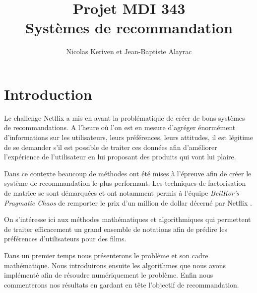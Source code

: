 \documentclass[10pt,a4paper]{article}
\title{Projet MDI 343 \\
Systèmes de recommandation}
\author{Nicolas Keriven et Jean-Baptiste Alayrac}
\begin{document}
\maketitle

\hrulefill
\vspace{2cm}

\newcommand{\jel}{\textsc{Jellyfish} }
\renewcommand{\tablename}{TABLEAU}

%
%


\newpage
\tableofcontents

\section*{Introduction}
 
 Le challenge Netflix a mis en avant la problématique de créer de bons systèmes de recommandations. A l'heure où l'on est en mesure d'agréger énormément d'informations sur les utilisateurs, leurs préférences, leurs attitudes, il est légitime de se demander s'il est possible de traiter ces données afin d'améliorer l'expérience de l'utilisateur en lui proposant des produits qui vont lui plaire.
 
 Dans ce contexte beaucoup de méthodes ont été mises à l'épreuve afin de créer le système de recommandation le plus performant. Les techniques de factorisation de matrice se sont démarquées et ont notamment permis à l'équipe \textit{BellKor's Pragmatic Chaos} de remporter le prix d'un million de dollar décerné par Netflix \cite{koren}.
 
 On s'intéresse ici aux méthodes mathématiques et algorithmiques qui permettent de traiter efficacement un grand ensemble de notations afin de prédire les préférences d'utilisateurs pour des films.
 
 Dans un premier temps nous présenterons le problème et son cadre mathématique. Nous introduirons ensuite les algorithmes que nous avons implémenté afin de résoudre numériquement le problème. Enfin nous commenterons nos résultats en gardant en tête l'objectif de recommandation.
\newpage
\end{document}
